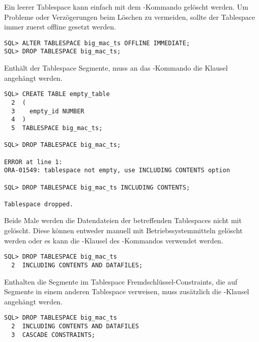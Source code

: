           Ein leerer Tablespace kann einfach mit dem -Kommando gel\"oscht werden. Um Probleme oder Verz\"ogerungen beim L\"oschen zu vermeiden, sollte der Tablespace immer zuerst offline gesetzt werden.
          \begin{lstlisting}[caption={Einen leeren Tablespace l\"oschen},label=admin118,language=oracle_sql]
SQL> ALTER TABLESPACE big_mac_ts OFFLINE IMMEDIATE;
SQL> DROP TABLESPACE big_mac_ts;
          \end{lstlisting}
          Enth\"alt der Tablespace Segmente, muss an das -Kommando die Klausel  angeh\"angt werden.
          \begin{lstlisting}[caption={Einen Tablespace mit Inhalt l\"oschen},label=admin119,language=oracle_sql]
SQL> CREATE TABLE empty_table
  2  (
  3    empty_id NUMBER
  4  )
  5  TABLESPACE big_mac_ts;

SQL> DROP TABLESPACE big_mac_ts;

ERROR at line 1:
ORA-01549: tablespace not empty, use INCLUDING CONTENTS option

SQL> DROP TABLESPACE big_mac_ts INCLUDING CONTENTS;

Tablespace dropped.
          \end{lstlisting}
          \begin{merke}
            Beide Male werden die Datendateien der betreffenden Tablespaces nicht mit gel\"oscht. Diese k\"onnen entweder manuell mit Betriebssystemmitteln gel\"oscht werden oder es kann die -Klausel des -Kommandos verwendet werden.
          \end{merke}
          \begin{lstlisting}[caption={Einen Tablespace mit Inhalt und Datendateien l\"oschen},label=admin120,language=oracle_sql]
SQL> DROP TABLESPACE big_mac_ts
  2  INCLUDING CONTENTS AND DATAFILES;
          \end{lstlisting}
          Enthalten die Segmente im Tablespace Fremdschl\"ussel-Constraints, die auf Segmente in einem anderen Tablespace verweisen, muss zus\"atzlich die -Klausel angeh\"angt werden.
          \begin{lstlisting}[caption={Einen Tablespace mit Inhalt, Datendateien und Constraints l\"oschen},label=admin121,language=oracle_sql]
SQL> DROP TABLESPACE big_mac_ts
  2  INCLUDING CONTENTS AND DATAFILES
  3  CASCADE CONSTRAINTS;
          \end{lstlisting}
